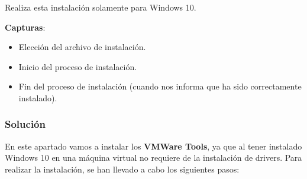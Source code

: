 Realiza esta instalación solamente para Windows 10.

\textbf{Capturas}:

\begin{itemize}
    \item Elección del archivo de instalación.
    \item Inicio del proceso de instalación.
    \item Fin del proceso de instalación (cuando nos informa que ha sido correctamente instalado).
\end{itemize}

\subsubsection{Solución}

En este apartado vamos a instalar los \textbf{VMWare Tools}, ya que al tener instalado Windows 10 en una máquina virtual no requiere de la instalación de drivers. Para realizar la instalación, se han llevado a cabo los siguientes pasos:

